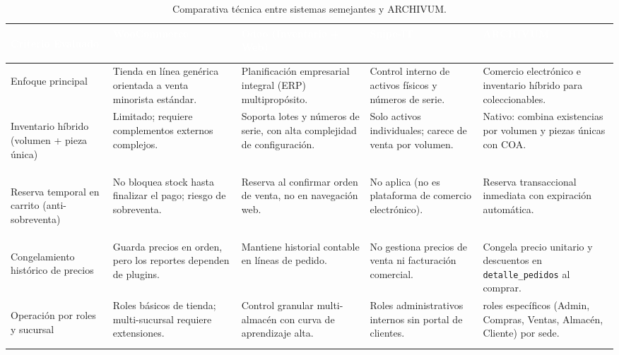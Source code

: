 \begin{table}[H]
\centering
\caption{Comparativa técnica entre sistemas semejantes y ARCHIVUM.}
\label{tab:comparativa_sistemas}
\renewcommand{\arraystretch}{1.2}
\setlength{\tabcolsep}{5pt}
\footnotesize
\begin{tabularx}{\textwidth}{>{\bfseries\color[HTML]{3B1E54}\raggedright\arraybackslash}p{3.0cm} >{\raggedright\arraybackslash}X >{\raggedright\arraybackslash}X >{\raggedright\arraybackslash}X >{\raggedright\arraybackslash}X}
\rowcolor[HTML]{3B1E54}
\textcolor{white}{\textbf{Criterio Evaluado}} & 
\textcolor{white}{\textbf{WooCommerce \cite{woocommerce_docs}}} & 
\textcolor{white}{\textbf{Odoo (Inventario + Web) \cite{odoo_docs}}} & 
\textcolor{white}{\textbf{Snipe-IT \cite{snipeit_docs}}} & 
\textcolor{white}{\textbf{ARCHIVUM}} \\
\hline

Enfoque principal & 
Tienda en línea genérica orientada a venta minorista estándar. & 
Planificación empresarial integral (ERP) multipropósito. & 
Control interno de activos físicos y números de serie. & 
Comercio electrónico e inventario híbrido para coleccionables. \\
\hline

\rowcolor[HTML]{F4F0F8}
Inventario híbrido (volumen + pieza única) & 
Limitado; requiere complementos externos complejos. & 
Soporta lotes y números de serie, con alta complejidad de configuración. & 
Solo activos individuales; carece de venta por volumen. & 
Nativo: combina existencias por volumen y piezas únicas con COA. \\
\hline

Reserva temporal en carrito (anti-sobreventa) & 
No bloquea stock hasta finalizar el pago; riesgo de sobreventa. & 
Reserva al confirmar orden de venta, no en navegación web. & 
No aplica (no es plataforma de comercio electrónico). & 
Reserva transaccional inmediata con expiración automática. \\
\hline

\rowcolor[HTML]{F4F0F8}
Congelamiento histórico de precios & 
Guarda precios en orden, pero los reportes dependen de plugins. & 
Mantiene historial contable en líneas de pedido. & 
No gestiona precios de venta ni facturación comercial. & 
Congela precio unitario y descuentos en \texttt{detalle\_pedidos} al comprar. \\
\hline

Operación por roles y sucursal & 
Roles básicos de tienda; multi-sucursal requiere extensiones. & 
Control granular multi-almacén con curva de aprendizaje alta. & 
Roles administrativos internos sin portal de clientes. & 
5 roles específicos (Admin, Compras, Ventas, Almacén, Cliente) por sede. \\
\hline
\end{tabularx}
\end{table}
\FloatBarrier
\clearpage

